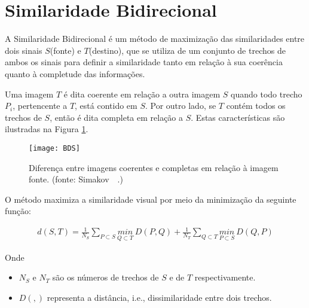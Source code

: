 
\section{Similaridade Bidirecional} \label{conceitoSimilaridadeBidirecional}
	A Similaridade Bidirecional \cite{simakov} é um método de maximização das similaridades entre dois sinais $S$(fonte) e $T$(destino), que se utiliza de um conjunto de trechos de ambos os sinais para definir a similaridade tanto em relação à sua coerência quanto à completude das informações.
	
	Uma imagem $T$ é dita coerente em relação a outra imagem $S$ quando todo trecho $P_i$, pertencente a $T$, está contido em $S$. Por outro lado, se $T$ contém todos os trechos de $S$, então é dita completa em relação a $S$. Estas características são ilustradas na Figura \ref{figConceitoBDS}.
	
\begin{figure}[H]
  \centering
  \texttt{[image: BDS]}
  \caption{Diferença entre imagens coerentes e completas em relação à imagem fonte. (fonte: Simakov~\etal~\protect\cite{simakov}.)}  
  \label{figConceitoBDS}
\end{figure}

	O método maximiza a similaridade visual por meio da minimização da seguinte função:
	
\begin{align} \label{eqConceitoSimilaridade}
          d(S,T) = \frac{1}{N_S}\sum\limits_{P \subset S}{\underset{Q \subset T}{min}~D(P,Q)} + \frac{1}{N_T}\sum\limits_{Q \subset T}{\underset{P \subset S}{min}~D(Q,P)}
\end{align}

Onde
\begin{itemize}
	\item $N_S$ e $N_T$ são os números de trechos de $S$ e de $T$ respectivamente.
	\item $D(,)$ representa a distância, i.e., dissimilaridade entre dois trechos. 
\end{itemize} 
	
